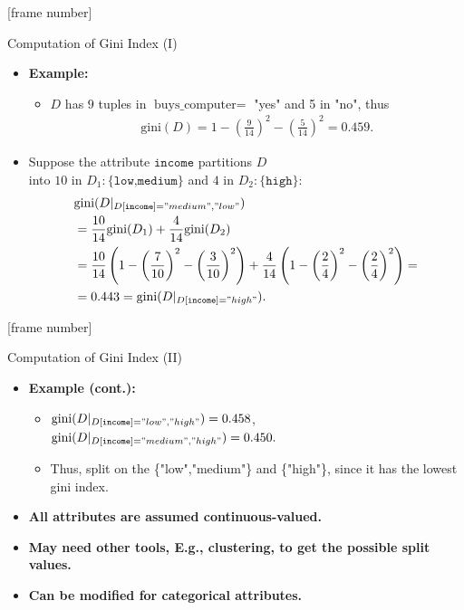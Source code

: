 \documentclass[aspectratio=169,t,table]{beamer}
\begin{document}
  {
    [frame number]
    \begin{frame}{Computation of Gini Index (I)}
      \begin{itemize}
        \item \textbf{Example:}
        \begin{itemize}
          \item $D$ has $9$ tuples in $\text{buys\_computer} =$ "yes" and 5 in "no", thus
          \begin{align}
            \text{gini}(D) = 1 - \left( \frac{9}{14} \right)^2 - \left( \frac{5}{14} \right)^2 = 0.459.
          \end{align}
        \end{itemize}
        \item Suppose the attribute $\texttt{income}$ partitions $D$ \\ into $10$ in $D_1:\{\texttt{low,medium}\}$ and $4$ in $D_2: \{\texttt{high}\}$:
        \begin{align}
          &\text{gini}(D\vert_{D[\texttt{income}]="medium", "low"}) \\
          &= \frac{10}{14} \text{gini}(D_1) + \frac{4}{14} \text{gini}(D_2)\\
          &=\frac{10}{14} \left(1-\left( \frac{7}{10} \right)^2 - \left( \frac{3}{10} \right)^2 \right) + \frac{4}{14} \left( 1-\left( \frac{2}{4} \right)^2 - \left( \frac{2}{4} \right)^2 \right) =\\
          &= 0.443 = \text{gini}(D\vert_{D[\texttt{income}]="high"}).
        \end{align}
      \end{itemize}
    \end{frame}
  }

  {
    [frame number]
    \begin{frame}{Computation of Gini Index (II)}
      \begin{itemize}
        \item \textbf{Example (cont.):}
        \begin{itemize}
          \item $\text{gini}(D\vert_{D[\texttt{income}]="low", "high"}) = 0.458$,\\
                $\text{gini}(D\vert_{D[\texttt{income}]="medium", "high"}) = 0.450.$
          \item Thus, split on the \{"low","medium"\} and \{"high"\}, since it has the lowest gini index.
        \end{itemize}
        \item \textbf{All attributes are assumed continuous-valued.}
        \item \textbf{May need other tools, E.g., clustering, to get the possible split values.}
        \item \textbf{Can be modified for categorical attributes.}
      \end{itemize}
    \end{frame}
  }
\end{document}
